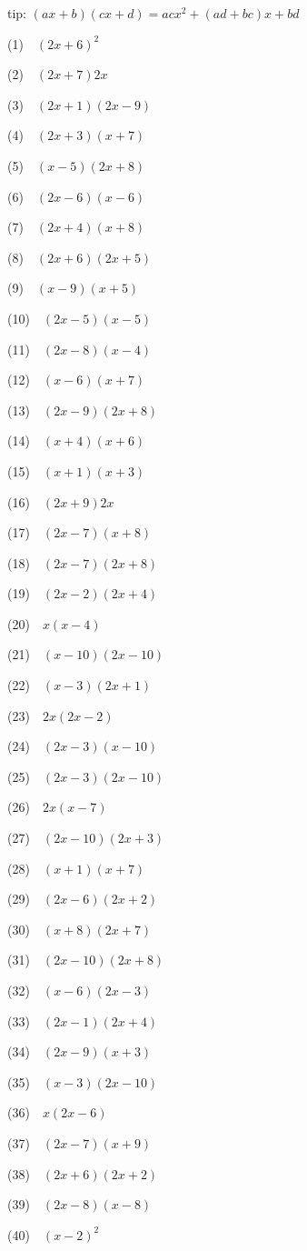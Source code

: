 \documentclass[a4j,twocolumn,10pt,fleqn]{jarticle}
\begin{document}
tip: $(ax + b)(cx + d) = acx^2 + (ad + bc)x + bd$

(1)~~$(2x+6)^2$

(2)~~$(2x+7)2x$

(3)~~$(2x+1)(2x-9)$

(4)~~$(2x+3)(x+7)$

(5)~~$(x-5)(2x+8)$

(6)~~$(2x-6)(x-6)$

(7)~~$(2x+4)(x+8)$

(8)~~$(2x+6)(2x+5)$

(9)~~$(x-9)(x+5)$

(10)~~$(2x-5)(x-5)$

(11)~~$(2x-8)(x-4)$

(12)~~$(x-6)(x+7)$

(13)~~$(2x-9)(2x+8)$

(14)~~$(x+4)(x+6)$

(15)~~$(x+1)(x+3)$

(16)~~$(2x+9)2x$

(17)~~$(2x-7)(x+8)$

(18)~~$(2x-7)(2x+8)$

(19)~~$(2x-2)(2x+4)$

(20)~~$x(x-4)$

(21)~~$(x-10)(2x-10)$

(22)~~$(x-3)(2x+1)$

(23)~~$2x(2x-2)$

(24)~~$(2x-3)(x-10)$

(25)~~$(2x-3)(2x-10)$

(26)~~$2x(x-7)$

(27)~~$(2x-10)(2x+3)$

(28)~~$(x+1)(x+7)$

(29)~~$(2x-6)(2x+2)$

(30)~~$(x+8)(2x+7)$

(31)~~$(2x-10)(2x+8)$

(32)~~$(x-6)(2x-3)$

(33)~~$(2x-1)(2x+4)$

(34)~~$(2x-9)(x+3)$

(35)~~$(x-3)(2x-10)$

(36)~~$x(2x-6)$

(37)~~$(2x-7)(x+9)$

(38)~~$(2x+6)(2x+2)$

(39)~~$(2x-8)(x-8)$

(40)~~$(x-2)^2$
\end{document}

